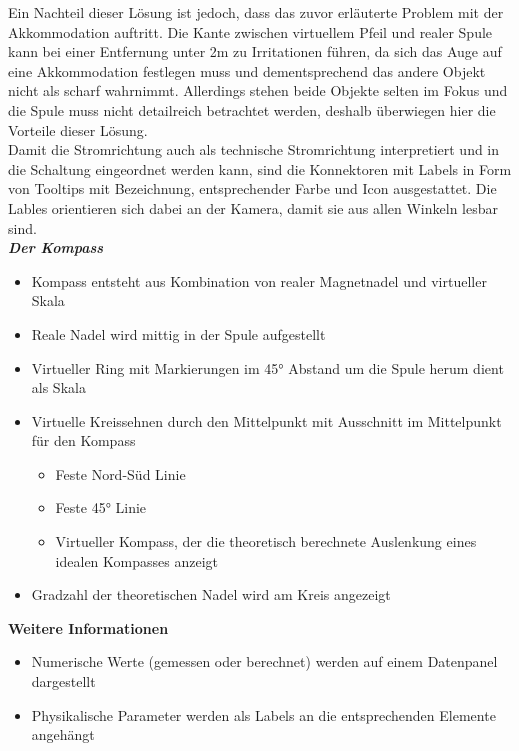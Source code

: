 Ein Nachteil dieser Lösung ist jedoch, dass das zuvor erläuterte Problem mit der Akkommodation auftritt. Die Kante zwischen virtuellem Pfeil und realer Spule kann bei einer Entfernung unter 2m zu Irritationen führen, da sich das Auge auf eine Akkommodation festlegen muss und dementsprechend das andere Objekt nicht als scharf wahrnimmt. Allerdings stehen beide Objekte selten im Fokus und die Spule muss nicht detailreich betrachtet werden, deshalb überwiegen hier die Vorteile dieser Lösung.\\

Damit die Stromrichtung auch als technische Stromrichtung interpretiert und in die Schaltung eingeordnet werden kann, sind die Konnektoren mit Labels in Form von Tooltips mit Bezeichnung, entsprechender Farbe und Icon ausgestattet. Die Lables orientieren sich dabei an der Kamera, damit sie aus allen Winkeln lesbar sind.\\

\textbf{\textit{Der Kompass}}
\begin{itemize}[topsep=-2px]
	\setlength{\itemsep}{-1pt}
	\singlespacing
	\item Kompass entsteht aus Kombination von realer Magnetnadel und virtueller Skala
	\item Reale Nadel wird mittig in der Spule aufgestellt
	\item Virtueller Ring mit Markierungen im 45° Abstand um die Spule herum dient als Skala	
	\item Virtuelle Kreissehnen durch den Mittelpunkt mit Ausschnitt im Mittelpunkt für den Kompass 
	\begin{itemize}[topsep=0px, label=\textbullet]
		\setlength{\itemsep}{-1pt}
		\item Feste Nord-Süd Linie
		\item Feste 45° Linie
		\item Virtueller Kompass, der die theoretisch berechnete Auslenkung eines idealen Kompasses anzeigt
	\end{itemize}
	\item Gradzahl der theoretischen Nadel wird am Kreis angezeigt
\end{itemize}
\vspace{8px}

\textbf{Weitere Informationen}
\begin{itemize}[topsep=-2px]
	\setlength{\itemsep}{-5pt}
	\item Numerische Werte (gemessen oder berechnet) werden auf einem Datenpanel dargestellt
	\item Physikalische Parameter werden als Labels an die entsprechenden Elemente angehängt
\end{itemize}
\vspace{4px}

